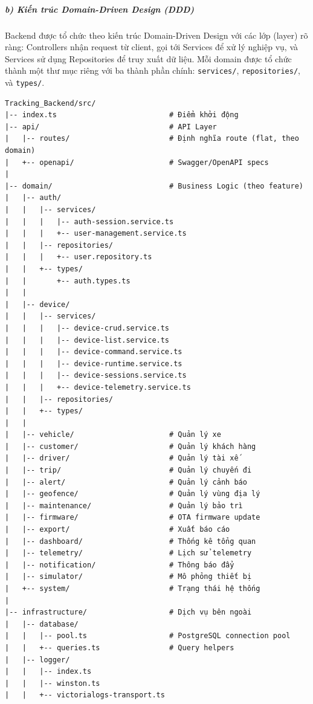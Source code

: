 \documentclass[13pt,a4paper]{extarticle}
\renewcommand{\\}{\thesislongtableorignewline\hline}%
\begin{document}
\subparagraph{b) Kiến trúc Domain-Driven Design
(DDD)}\label{b-kiux1ebfn-truxfac-domain-driven-design-ddd-1}

Backend được tổ chức theo kiến trúc Domain-Driven Design với các lớp
(layer) rõ ràng: Controllers nhận request từ client, gọi tới Services để
xử lý nghiệp vụ, và Services sử dụng Repositories để truy xuất dữ liệu.
Mỗi domain được tổ chức thành một thư mục riêng với ba thành phần chính:
\texttt{services/}, \texttt{repositories/}, và \texttt{types/}.

\begin{verbatim}
Tracking_Backend/src/
|-- index.ts                          # Điểm khởi động
|-- api/                              # API Layer
|   |-- routes/                       # Định nghĩa route (flat, theo domain)
|   +-- openapi/                      # Swagger/OpenAPI specs
|
|-- domain/                           # Business Logic (theo feature)
|   |-- auth/
|   |   |-- services/
|   |   |   |-- auth-session.service.ts
|   |   |   +-- user-management.service.ts
|   |   |-- repositories/
|   |   |   +-- user.repository.ts
|   |   +-- types/
|   |       +-- auth.types.ts
|   |
|   |-- device/
|   |   |-- services/
|   |   |   |-- device-crud.service.ts
|   |   |   |-- device-list.service.ts
|   |   |   |-- device-command.service.ts
|   |   |   |-- device-runtime.service.ts
|   |   |   |-- device-sessions.service.ts
|   |   |   +-- device-telemetry.service.ts
|   |   |-- repositories/
|   |   +-- types/
|   |
|   |-- vehicle/                      # Quản lý xe
|   |-- customer/                     # Quản lý khách hàng
|   |-- driver/                       # Quản lý tài xế
|   |-- trip/                         # Quản lý chuyến đi
|   |-- alert/                        # Quản lý cảnh báo
|   |-- geofence/                     # Quản lý vùng địa lý
|   |-- maintenance/                  # Quản lý bảo trì
|   |-- firmware/                     # OTA firmware update
|   |-- export/                       # Xuất báo cáo
|   |-- dashboard/                    # Thống kê tổng quan
|   |-- telemetry/                    # Lịch sử telemetry
|   |-- notification/                 # Thông báo đẩy
|   |-- simulator/                    # Mô phỏng thiết bị
|   +-- system/                       # Trạng thái hệ thống
|
|-- infrastructure/                   # Dịch vụ bên ngoài
|   |-- database/
|   |   |-- pool.ts                   # PostgreSQL connection pool
|   |   +-- queries.ts                # Query helpers
|   |-- logger/
|   |   |-- index.ts
|   |   |-- winston.ts
|   |   +-- victorialogs-transport.ts

\end{verbatim}
\end{document}
